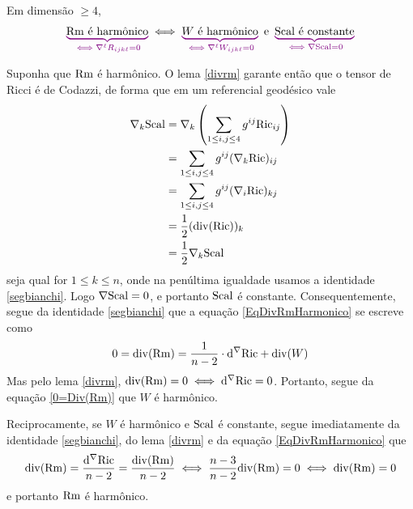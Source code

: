         \begin{proposicao}\label{CaractRmHarmonico} Em dimensão $\geq 4$, 
        \[
        \Munderbrace{\Rm \text{ é harmônico}}{\iff \nabla^{\ell} R_{ijk\ell} = 0} \iff \Munderbrace{W \text{ é harmônico}}{\iff \nabla^{\ell} W_{ijk \ell} = 0} \text{ e } \Munderbrace{\Scal \text{ é constante} }{\iff \nabla \Scal = 0}
        \]
        \end{proposicao}
        \begin{demm}
        Suponha que $\mathrm{Rm}$ é harmônico. O lema \cref{divrm} garante então que o tensor de Ricci é de Codazzi, de forma que em um referencial geodésico vale
        \[ \begin{aligned}
        \nabla_k \mathrm{Scal} &= \nabla_k\left( \sum_{1 \leq i, j \leq 4} g^{ij} \mathrm{Ric}_{ij} \right) \\
        &= \sum_{1 \leq i, j \leq 4} g^{ij} (\nabla_k \mathrm{Ric})_{ij}  \\
        &= \sum_{1 \leq i, j \leq 4} g^{ij} (\nabla_i \mathrm{Ric})_{kj} \\
        &= \frac{1}{2} (\mathrm{div}(\mathrm{Ric}))_k \\
        &= \frac{1}{2} \nabla_k \mathrm{Scal}
        \end{aligned}
        \]
        seja qual for $1 \leq k \leq n$, onde na penúltima igualdade usamos a identidade \cref{segbianchi}. Logo $\nabla \mathrm{Scal} = 0$, e portanto $\mathrm{Scal}$ é constante. Consequentemente, segue da identidade \cref{segbianchi} que a equação \cref{EqDivRmHarmonico} se escreve como
        \begin{equation}\label{0=Div(Rm)}
        0 = \mathrm{div}(\mathrm{Rm}) = \frac{1}{n-2} \cdot \mathrm{d}^{\nabla} \mathrm{Ric} + \mathrm{div}(W)
        \end{equation}
        Mas pelo lema \cref{divrm}, $\mathrm{div}(\mathrm{Rm}) = 0 \iff \mathrm{d}^{\nabla} \mathrm{Ric} = 0$. Portanto, segue da equação \cref{0=Div(Rm)} que $W$ é harmônico. \par 
        Reciprocamente, se $W$ é harmônico e $\mathrm{Scal}$ é constante, segue imediatamente da identidade \cref{segbianchi}, do lema \cref{divrm} e da equação \cref{EqDivRmHarmonico} que
        \[
        \mathrm{div}(\mathrm{Rm}) = \frac{\mathrm{d}^{\nabla} \mathrm{Ric}}{n-2} = \frac{\mathrm{div}(\mathrm{Rm})}{n-2} \iff \frac{n-3}{n-2} \mathrm{div}(\mathrm{Rm}) = 0 \iff \mathrm{div}(\mathrm{Rm}) = 0
        \]
        e portanto $\mathrm{Rm}$ é harmônico.
        \end{demm}

      

